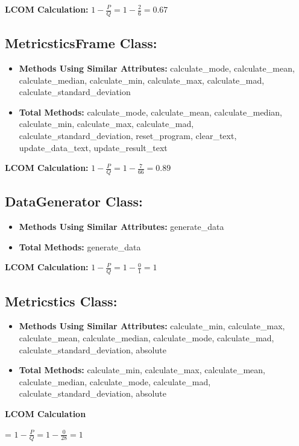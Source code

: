 {{{{\textbf{LCOM Calculation:} $1 - \frac{P}{Q} = 1 - \frac{2}{6} = 0.67$

\subsection*{MetricsticsFrame Class: }
\begin{itemize}
    \item \textbf{Methods Using Similar Attributes:} calculate\_mode, calculate\_mean, calculate\_median, calculate\_min, calculate\_max, calculate\_mad, calculate\_standard\_deviation
    \item \textbf{Total Methods:} calculate\_mode, calculate\_mean, calculate\_median, calculate\_min, calculate\_max, calculate\_mad, calculate\_standard\_deviation, reset\_program, clear\_text, update\_data\_text, update\_result\_text
\end{itemize}

\textbf{LCOM Calculation:} $1 - \frac{P}{Q} = 1 - \frac{7}{66} = 0.89$

\subsection*{DataGenerator Class: }
\begin{itemize}
    \item \textbf{Methods Using Similar Attributes:} generate\_data
    \item \textbf{Total Methods:} generate\_data
\end{itemize}

\textbf{LCOM Calculation: } $1  - \frac{P}{Q} = 1 - \frac{0}{1} = 1$

\subsection*{Metricstics Class: }
\begin{itemize}
    \item \textbf{Methods Using Similar Attributes:} calculate\_min, calculate\_max, calculate\_mean, calculate\_median, calculate\_mode, calculate\_mad, calculate\_standard\_deviation, absolute
    \item \textbf{Total Methods:} calculate\_min, calculate\_max, calculate\_mean, calculate\_median, calculate\_mode, calculate\_mad, calculate\_standard\_deviation, absolute
\end{itemize}

\textbf{LCOM Calculation}} = $1  - \frac{P}{Q} = 1 - \frac{0}{28} = 1$ \linebreak

}}}
